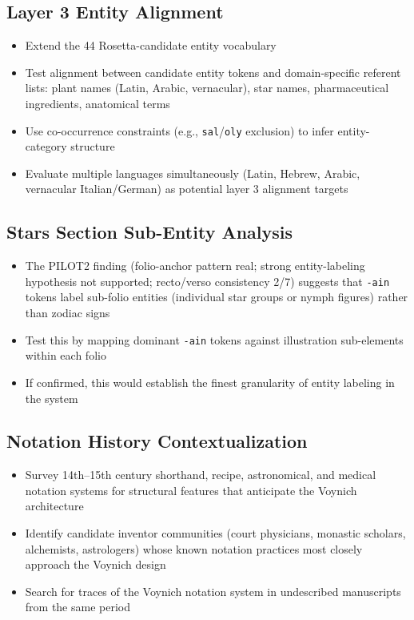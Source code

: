 \documentclass[11pt,a4paper,twocolumn]{article}
\begin{document}
\subsection{Layer 3 Entity Alignment}

\begin{itemize}[leftmargin=*,itemsep=2pt]
    \item Extend the 44 Rosetta-candidate entity vocabulary
    \item Test alignment between candidate entity tokens and domain-specific referent lists: plant names (Latin, Arabic, vernacular), star names, pharmaceutical ingredients, anatomical terms
    \item Use co-occurrence constraints (e.g., \texttt{sal}/\texttt{oly} exclusion) to infer entity-category structure
    \item Evaluate multiple languages simultaneously (Latin, Hebrew, Arabic, vernacular Italian/German) as potential layer 3 alignment targets
\end{itemize}

\subsection{Stars Section Sub-Entity Analysis}

\begin{itemize}[leftmargin=*,itemsep=2pt]
    \item The PILOT2 finding (folio-anchor pattern real; strong entity-labeling hypothesis not supported; recto/verso consistency 2/7) suggests that \texttt{-ain} tokens label sub-folio entities (individual star groups or nymph figures) rather than zodiac signs
    \item Test this by mapping dominant \texttt{-ain} tokens against illustration sub-elements within each folio
    \item If confirmed, this would establish the finest granularity of entity labeling in the system
\end{itemize}

\subsection{Notation History Contextualization}

\begin{itemize}[leftmargin=*,itemsep=2pt]
    \item Survey 14th--15th century shorthand, recipe, astronomical, and medical notation systems for structural features that anticipate the Voynich architecture
    \item Identify candidate inventor communities (court physicians, monastic scholars, alchemists, astrologers) whose known notation practices most closely approach the Voynich design
    \item Search for traces of the Voynich notation system in undescribed manuscripts from the same period
\end{itemize}
\end{document}
